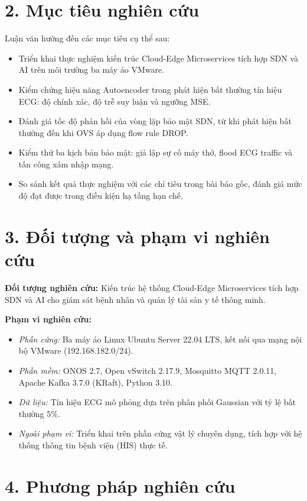 \section*{2. Mục tiêu nghiên cứu}

Luận văn hướng đến các mục tiêu cụ thể sau:

\begin{itemize}
    \item Triển khai thực nghiệm kiến trúc Cloud-Edge Microservices tích hợp SDN và AI trên môi trường ba máy ảo VMware.
    \item Kiểm chứng hiệu năng Autoencoder trong phát hiện bất thường tín hiệu ECG: độ chính xác, độ trễ suy luận và ngưỡng MSE.
    \item Đánh giá tốc độ phản hồi của vòng lặp bảo mật SDN, từ khi phát hiện bất thường đến khi OVS áp dụng flow rule DROP.
    \item Kiểm thử ba kịch bản bảo mật: giả lập sự cố máy thở, flood ECG traffic và tấn công xâm nhập mạng.
    \item So sánh kết quả thực nghiệm với các chỉ tiêu trong bài báo gốc, đánh giá mức độ đạt được trong điều kiện hạ tầng hạn chế.
\end{itemize}

\section*{3. Đối tượng và phạm vi nghiên cứu}

\textbf{Đối tượng nghiên cứu:} Kiến trúc hệ thống Cloud-Edge Microservices tích hợp SDN và AI cho giám sát bệnh nhân và quản lý tài sản y tế thông minh.

\textbf{Phạm vi nghiên cứu:}
\begin{itemize}
    \item \textit{Phần cứng:} Ba máy ảo Linux Ubuntu Server 22.04 LTS, kết nối qua mạng nội bộ VMware (192.168.182.0/24).
    \item \textit{Phần mềm:} ONOS 2.7, Open vSwitch 2.17.9, Mosquitto MQTT 2.0.11, Apache Kafka 3.7.0 (KRaft), Python 3.10.
    \item \textit{Dữ liệu:} Tín hiệu ECG mô phỏng dựa trên phân phối Gaussian với tỷ lệ bất thường 5\%.
    \item \textit{Ngoài phạm vi:} Triển khai trên phần cứng vật lý chuyên dụng, tích hợp với hệ thống thông tin bệnh viện (HIS) thực tế.
\end{itemize}

\section*{4. Phương pháp nghiên cứu}

